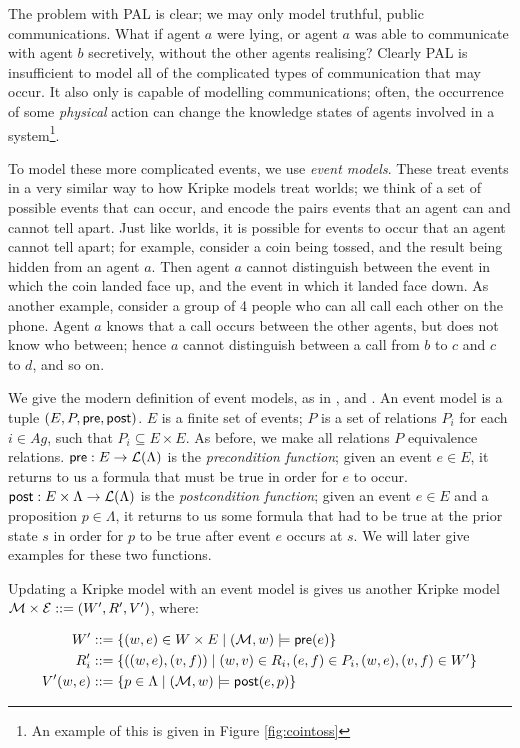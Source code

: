 \documentclass[ %
                    author={Leo Poulson},
                supervisor={Dr. Steven Ramsay},
                    degree={BSc},
                     title={Epistemic Planning for the Dynamic Gossip problem},
                  subtitle={},
                      year={2019} ]{dissertation}
\begin{document}
The problem with PAL is clear; we may only model truthful, public
communications. What if agent $a$ were lying, or agent $a$ was able to
communicate with agent $b$ secretively, without the other agents realising?
Clearly PAL is insufficient to model all of the complicated types of
communication that may occur. It also only is capable of modelling
communications; often, the occurrence of some \emph{physical} action can change
the knowledge states of agents involved in a system\footnote{An example of this
  is given in Figure \ref{fig:cointoss}}. 

To model these more complicated events, we use \emph{event models}. These treat
events in a very similar way to how Kripke models treat worlds; we think of a
set of possible events that can occur, and encode the pairs events that an agent
can and cannot tell apart. Just like worlds, it is possible for events to occur
that an agent cannot tell apart; for example, consider a coin being tossed, and
the result being hidden from an agent $a$. Then agent $a$ cannot distinguish
between the event in which the coin landed face up, and the event in which it
landed face down. As another example, consider a group of 4 people who can all
call each other on the phone. Agent $a$ knows that a call occurs between the
other agents, but does not know who between; hence $a$ cannot distinguish
between a call from $b$ to $c$ and $c$ to $d$, and so on.

We give the modern definition of event models, as in \cite{MalvinThesis}, and
\cite{AutomataTechniques}. An event model  is a tuple $(E, P, \textsf{pre},
\textsf{post})$. $E$ is a finite set of events; $P$ is a set of relations $P_i$ for each
$i \in Ag$, such that $P_i \subseteq E \times E$. As before, we make all
relations $P$ equivalence relations. $\textsf{pre} : E \rightarrow \mathcal{L}(\Lambda) $ is
the \emph{precondition function}; given an event $e \in E$, it returns to us a
formula that must be true in order for $e$ to occur. $\textsf{post} : E \times \Lambda
\rightarrow \mathcal{L}(\Lambda)$ is the \emph{postcondition function}; given an
event $e \in E$ and a proposition $p \in \Lambda$, it returns to us some formula
that had to be true at the prior state $s$ in order for $p$ to be true after
event $e$ occurs at $s$. We will later give examples for these two functions.

Updating a Kripke model  with an event model  is gives us another
Kripke model $\mathcal{M} \times \mathcal{E} ::= (W', R', V')$, where:

\begin{align*}
  W'   &::= \left\{(w, e) \in W \times E \mid (\mathcal{M}, w) \models \textsf{pre}(e)\right\} \\
  R_i' &::= \left\{((w, e), (v, f)) \mid (w, v) \in R_i, (e, f) \in P_i, (w, e), (v, f) \in W' \right\} \\
  V'(w, e) &::= \left\{ p \in \Lambda \mid (\mathcal{M}, w) \models \textsf{post}(e, p) \right\}
\end{align*}
\end{document}
